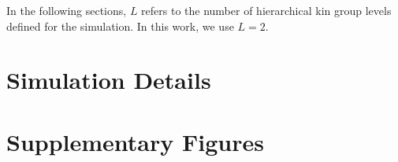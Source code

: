 \clearpage
\onecolumn



\clearpage
\twocolumn






% 


In the following sections, $L$ refers to the number of hierarchical kin group levels defined for the simulation.
In this work, we use $L=2$.






\section{Simulation Details}
\label{sec:simulation-details}


















% 


\section{Supplementary Figures}


